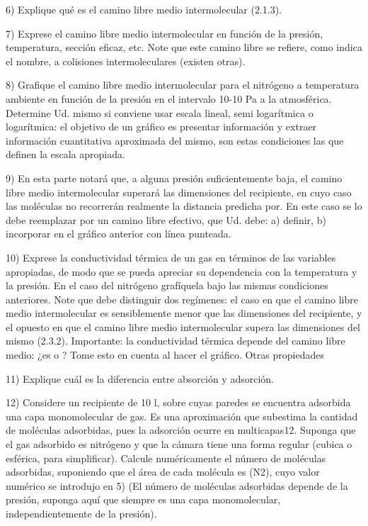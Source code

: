 \documentclass[letterpaper,11pt]{article}
\begin{document}
6) Explique qué es el camino libre medio intermolecular (2.1.3).

7) Exprese el camino libre medio intermolecular en función de la presión, temperatura,
sección eficaz, etc. Note que este camino libre se refiere, como indica el nombre,
a colisiones intermoleculares (existen otras).

8) Grafique el camino libre medio intermolecular para el nitrógeno a temperatura
ambiente en función de la presión en el intervalo 10-10 Pa a la atmosférica.
Determine Ud. mismo si conviene usar escala lineal, semi logarítmica o logarítmica:
el objetivo de un gráfico es presentar información y extraer información cuantitativa
aproximada del mismo, son estas condiciones las que definen la escala apropiada.

9) En esta parte notará que, a alguna presión suficientemente baja, el camino libre
medio intermolecular superará las dimensiones del recipiente, en cuyo caso las
moléculas no recorrerán realmente la distancia predicha por. En este caso se lo
debe reemplazar por un camino libre efectivo, que Ud. debe:
a) definir,
b) incorporar en el gráfico anterior con línea punteada.

10) Exprese la conductividad térmica de un gas en términos de las variables apropiadas,
de modo que se pueda apreciar su dependencia con la temperatura y la presión. En
el caso del nitrógeno grafíquela bajo las mismas condiciones anteriores. Note que
debe distinguir dos regímenes: el caso en que el camino libre medio intermolecular
es sensiblemente menor que las dimensiones del recipiente, y el opuesto en que el
camino libre medio intermolecular supera las dimensiones del mismo (2.3.2).
Importante: la conductividad térmica depende del camino libre medio: ¿es o ?
Tome esto en cuenta al hacer el gráfico.
Otras propiedades

11) Explique cuál es la diferencia entre absorción y adsorción.

12) Considere un recipiente de 10 l, sobre cuyas paredes se encuentra adsorbida una
capa monomolecular de gas. Es una aproximación que subestima la cantidad de
moléculas adsorbidas, pues la adsorción ocurre en multicapas12. Suponga que el gas
adsorbido es nitrógeno y que la cámara tiene una forma regular (cubica o esférica,
para simplificar).
Calcule numéricamente el número de moléculas adsorbidas, suponiendo que el área
de cada molécula es (N2), cuyo valor numérico se introdujo en 5) (El número de moléculas adsorbidas depende de la presión, suponga aquí que siempre es una capa
monomolecular, independientemente de la presión).
\end{document}
